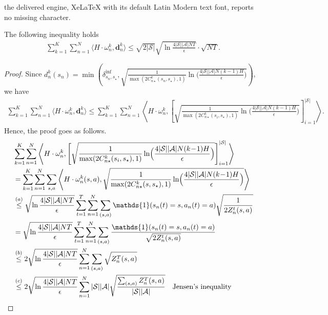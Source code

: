 \documentclass[10pt,a4paper]{amsart}
\newcommand{\cA}{\mathcal{A}}
\newcommand{\cS}{\mathcal{S}}
\begin{document}
the delivered engine, XeLaTeX with its default Latin Modern text font, reports no missing character.
\begin{lemma}\label{lem:10}
The following inequality holds
\begin{align*}
   \sum_{k=1}^K\sum_{n=1}^N\langle  H\cdot\omega_n^k, \mathbf{d}_n^k \rangle \leq
\sqrt{2|\cS|}\sqrt{\ln\frac{4|\cS||\cA|NT}{\epsilon}}\cdot \sqrt{NT}.
\end{align*}
\end{lemma}

\begin{proof}
Since $d_n^k(s_n) = \min\left(\delta^{\text{inf}}_{s_n, s_{\star}},\sqrt{\frac{1}{\max(2C_{n\star}^k(s_n, s_\star),1)}\ln\!\Big(\frac{4|\cS||\cA|N(k\!-\!1)H}{\epsilon}\Big)}\right)$, we have 
\begin{align}
    \sum_{k=1}^K\sum_{n=1}^N\langle  H\cdot\omega_n^k, \mathbf{d}_n^k \rangle\leq \sum_{k=1}^K\sum_{n=1}^N\left\langle  H\cdot\omega_n^k, \left[\sqrt{\frac{1}{\max(2C_{n\star}^k(s_i, s_\star),1)}\ln\!\Big(\frac{4|\cS||\cA|N(k\!-\!1)H}{\epsilon}\Big)} \right]_{i=1}^{|\cS|}\right\rangle.
\end{align}
Hence, the proof goes as follows.
\begin{align}
&\sum_{k=1}^K\sum_{n=1}^N\left\langle  H\cdot\omega_n^k, \left[\sqrt{\frac{1}{\max(2C_{n\star}^k(s_i, s_\star),1)}\ln\!\Big(\frac{4|\cS||\cA|N(k\!-\!1)H}{\epsilon}\Big)} \right]_{i=1}^{|\cS|}\right\rangle\nonumber\allowdisplaybreaks\\
&=\sum_{k=1}^K\sum_{n=1}^N\sum_{s,a}\left\langle  H\cdot\omega_n^k(s,a), \sqrt{\frac{1}{\max(2C_{n\star}^k(s, s_\star),1)}\ln\!\Big(\frac{4|\cS||\cA|N(k\!-\!1)H}{\epsilon}\Big)} \right\rangle\nonumber\allowdisplaybreaks\\
 &\overset{(a)}{\leq} \sqrt{\ln\frac{4|\cS||\cA|NT}{\epsilon}}\sum_{t=1}^{T}\sum_{n=1}^N\sum_{(s,a)}\mathds{1}(s_n(t)=s,a_n(t)= a) \sqrt{\frac{1}{2Z_n^{t}(s,a)}}\nonumber\allowdisplaybreaks\\
   &= \sqrt{\ln\frac{4|\cS||\cA|NT}{\epsilon}}\sum_{t=1}^{T}\sum_{n=1}^N\sum_{(s,a)}\frac{\mathds{1}(s_n(t)=s,a_n(t)= a)}{ \sqrt{{2Z_n^{t}(s,a)}}}\nonumber\allowdisplaybreaks\\
  &\overset{(b)}{\leq}  2\sqrt{\ln\frac{4|\cS||\cA|NT}{\epsilon}}\sum_{n=1}^N\sum_{(s,a)}{ \sqrt{{Z_n^{T}(s,a)}}}\nonumber\allowdisplaybreaks\\
  &\overset{(c)}{\leq}  2\sqrt{\ln\frac{4|\cS||\cA|NT}{\epsilon}}\sum_{n=1}^N{ |\cS||\cA|\sqrt{\frac{\sum_{(s,a)}{Z_n^{T}(s,a)}}{|\cS||\cA|}}}~~~\text{Jensen's inequality}\nonumber\allowdisplaybreaks\\

\end{align}
\end{proof}
\end{document}
